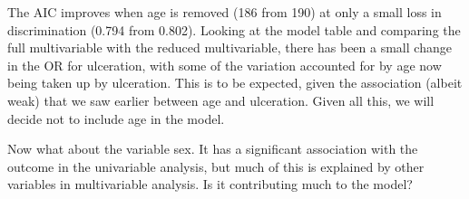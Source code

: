 \documentclass[
  12pt,
  krantz2]{krantz}
\makeatletter
\newenvironment{Shaded}{\begin{snugshade}}{\end{snugshade}}
\newcommand{\DataTypeTok}[1]{\textcolor[rgb]{0.13,0.29,0.53}{#1}}
\newcommand{\KeywordTok}[1]{\textcolor[rgb]{0.13,0.29,0.53}{\textbf{#1}}}
\newcommand{\NormalTok}[1]{#1}
\newcommand{\OperatorTok}[1]{\textcolor[rgb]{0.81,0.36,0.00}{\textbf{#1}}}
\newcommand{\OtherTok}[1]{\textcolor[rgb]{0.56,0.35,0.01}{#1}}
\newcommand{\StringTok}[1]{\textcolor[rgb]{0.31,0.60,0.02}{#1}}
\newenvironment{kframe}{%
\medskip{}
\setlength{\fboxsep}{.8em}
 \def\at@end@of@kframe{}%
 \ifinner\ifhmode%
  \def\at@end@of@kframe{\end{minipage}}%
  \begin{minipage}{\columnwidth}%
 \fi\fi%
 \def\FrameCommand##1{\hskip\@totalleftmargin \hskip-\fboxsep
 \colorbox{shadecolor}{##1}\hskip-\fboxsep
     \hskip-\linewidth \hskip-\@totalleftmargin \hskip\columnwidth}%
 \MakeFramed {\advance\hsize-\width
   \@totalleftmargin\z@ \linewidth\hsize
   \@setminipage}}%
 {\par\unskip\endMakeFramed%
 \at@end@of@kframe}
\renewenvironment{Shaded}{\begin{kframe}}{\end{kframe}}
\makeatother
\begin{document}
The AIC improves when age is removed (186 from 190) at only a small loss in discrimination (0.794 from 0.802).
Looking at the model table and comparing the full multivariable with the reduced multivariable, there has been a small change in the OR for ulceration, with some of the variation accounted for by age now being taken up by ulceration.
This is to be expected, given the association (albeit weak) that we saw earlier between age and ulceration.
Given all this, we will decide not to include age in the model.

Now what about the variable sex.
It has a significant association with the outcome in the univariable analysis, but much of this is explained by other variables in multivariable analysis.
Is it contributing much to the model?

\begin{Shaded}
\end{Shaded}
\end{document}
